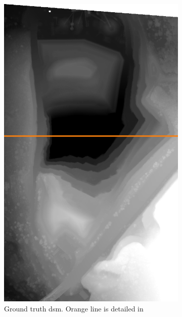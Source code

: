 \begin{figure}
    \begin{subfigure}[t]{0.33\linewidth}
        \flushleft
        \includegraphics[width=\linewidth]{Images/Chap_6/Carriere_gt_Monaco.png}
        \caption{Ground truth \acrshort{dsm}. Orange line is detailed in }
        \label{fig:Carriere_gt}
    \end{subfigure}\hfill
    \begin{subfigure}[t]{0.33\linewidth}
        \centering

\end{subfigure}
\end{figure}
